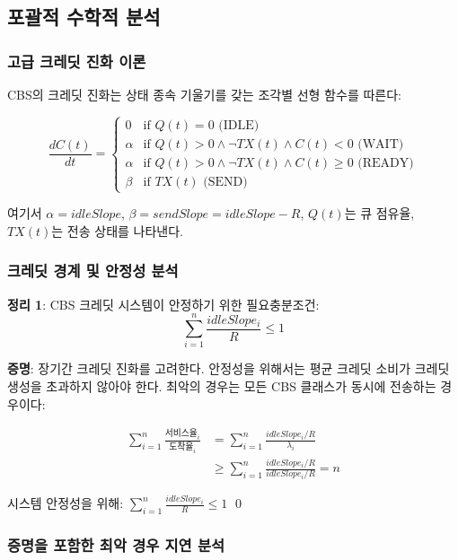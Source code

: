\documentclass[twocolumn,10pt]{article}
\begin{document}
\subsection{포괄적 수학적 분석}

\subsubsection{고급 크레딧 진화 이론}

CBS의 크레딧 진화는 상태 종속 기울기를 갖는 조각별 선형 함수를 따른다:

\begin{equation}
\frac{dC(t)}{dt} = \begin{cases}
0 & \text{if } Q(t) = 0 \text{ (IDLE)} \\
\alpha & \text{if } Q(t) > 0 \wedge \neg TX(t) \wedge C(t) < 0 \text{ (WAIT)} \\
\alpha & \text{if } Q(t) > 0 \wedge \neg TX(t) \wedge C(t) \geq 0 \text{ (READY)} \\
\beta & \text{if } TX(t) \text{ (SEND)}
\end{cases}
\end{equation}

여기서 $\alpha = idleSlope$, $\beta = sendSlope = idleSlope - R$, $Q(t)$는 큐 점유율, $TX(t)$는 전송 상태를 나타낸다.

\subsubsection{크레딧 경계 및 안정성 분석}

\textbf{정리 1}: CBS 크레딧 시스템이 안정하기 위한 필요충분조건:
\begin{equation}
\sum_{i=1}^{n} \frac{idleSlope_i}{R} \leq 1
\end{equation}

\textbf{증명}: 장기간 크레딧 진화를 고려한다. 안정성을 위해서는 평균 크레딧 소비가 크레딧 생성을 초과하지 않아야 한다. 최악의 경우는 모든 CBS 클래스가 동시에 전송하는 경우이다:

\begin{align}
\sum_{i=1}^{n} \frac{\text{서비스율}_i}{\text{도착율}_i} &= \sum_{i=1}^{n} \frac{idleSlope_i/R}{\lambda_i} \\
&\geq \sum_{i=1}^{n} \frac{idleSlope_i/R}{idleSlope_i/R} = n
\end{align}

시스템 안정성을 위해: $\sum_{i=1}^{n} \frac{idleSlope_i}{R} \leq 1$ \qed

\subsubsection{증명을 포함한 최악 경우 지연 분석}
\end{document}
